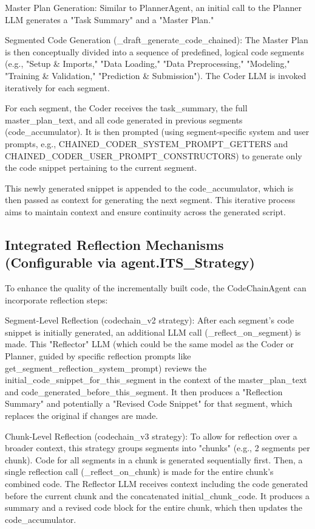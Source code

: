Master Plan Generation: Similar to PlannerAgent, an initial call to the Planner LLM generates a "Task Summary" and a "Master Plan."

Segmented Code Generation (_draft\_generate\_code\_chained): The Master Plan is then conceptually divided into a sequence of predefined, logical code segments (e.g., "Setup \& Imports," "Data Loading," "Data Preprocessing," "Modeling," "Training \& Validation," "Prediction \& Submission"). The Coder LLM is invoked iteratively for each segment.

For each segment, the Coder receives the task_summary, the full master_plan_text, and all code generated in previous segments (code_accumulator). It is then prompted (using segment-specific system and user prompts, e.g., CHAINED\_CODER\_SYSTEM\_PROMPT\_GETTERS and CHAINED\_CODER\_USER\_PROMPT\_CONSTRUCTORS) to generate only the code snippet pertaining to the current segment.

This newly generated snippet is appended to the code_accumulator, which is then passed as context for generating the next segment. This iterative process aims to maintain context and ensure continuity across the generated script.

\subsection{Integrated Reflection Mechanisms (Configurable via agent.ITS\_Strategy)}
To enhance the quality of the incrementally built code, the CodeChainAgent can incorporate reflection steps:

Segment-Level Reflection (codechain\_v2 strategy): After each segment's code snippet is initially generated, an additional LLM call (_reflect\_on\_segment) is made. This "Reflector" LLM (which could be the same model as the Coder or Planner, guided by specific reflection prompts like get\_segment\_reflection\_system\_prompt) reviews the initial\_code\_snippet\_for\_this\_segment in the context of the master\_plan\_text and code\_generated\_before\_this\_segment. It then produces a "Reflection Summary" and potentially a "Revised Code Snippet" for that segment, which replaces the original if changes are made.

Chunk-Level Reflection (codechain\_v3 strategy): To allow for reflection over a broader context, this strategy groups segments into "chunks" (e.g., 2 segments per chunk). Code for all segments in a chunk is generated sequentially first. Then, a single reflection call (_reflect\_on\_chunk) is made for the entire chunk's combined code. The Reflector LLM receives context including the code generated before the current chunk and the concatenated initial\_chunk\_code. It produces a summary and a revised code block for the entire chunk, which then updates the code\_accumulator.

